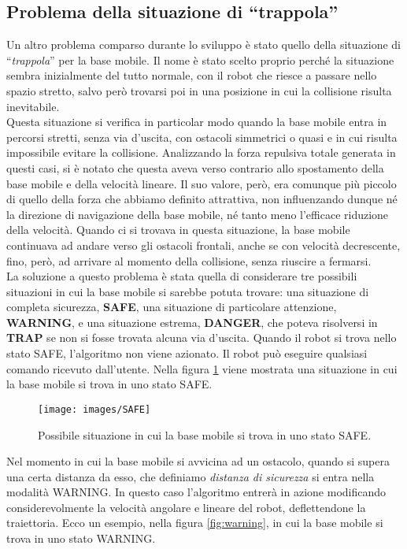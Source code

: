 \subsection{Problema della situazione di ``trappola''}
Un altro problema comparso durante lo sviluppo è stato quello della situazione di ``\textit{trappola}'' per la base mobile. Il nome è stato scelto proprio perché la situazione sembra inizialmente del tutto normale, con il robot che riesce a passare nello spazio stretto, salvo però trovarsi poi in una posizione in cui la collisione risulta inevitabile.\\
Questa situazione si verifica in particolar modo quando la base mobile entra in percorsi stretti, senza via d'uscita, con ostacoli simmetrici o quasi e in cui risulta impossibile evitare la collisione. Analizzando la forza repulsiva totale generata in questi casi, si è notato che questa aveva verso contrario allo spostamento della base mobile e della velocità lineare. Il suo valore, però, era comunque più piccolo di quello della forza che abbiamo definito attrattiva, non influenzando dunque né la direzione di navigazione della base mobile, né tanto meno l'efficace riduzione della velocità. Quando ci si trovava in questa situazione, la base mobile continuava ad andare verso gli ostacoli frontali, anche se con velocità decrescente, fino, però, ad arrivare al momento della collisione, senza riuscire a fermarsi.\\La soluzione a questo problema è stata quella di considerare tre possibili situazioni in cui la base mobile si sarebbe potuta trovare: una situazione di completa sicurezza, \textbf{SAFE}, una situazione di particolare attenzione, \textbf{WARNING}, e una situazione estrema, \textbf{DANGER}, che poteva risolversi in \textbf{TRAP} se non si fosse trovata alcuna via d'uscita. Quando il robot si trova nello stato SAFE, l’algoritmo non viene azionato. Il robot può eseguire qualsiasi comando ricevuto dall’utente. Nella figura \ref{fig:safe} viene mostrata una situazione in cui la base mobile si trova in uno stato SAFE.
\begin{figure}[H]
	\centering
	\texttt{[image: images/SAFE]}
	\caption{Possibile situazione in cui la base mobile si trova in uno stato SAFE.}
	\label{fig:safe}
\end{figure}
Nel momento in cui la base mobile si avvicina ad un ostacolo, quando si supera una certa distanza da esso, che definiamo \textit{distanza di sicurezza} si entra nella modalità WARNING. In questo caso l’algoritmo entrerà in azione modificando considerevolmente la velocità angolare e lineare del robot, deflettendone la traiettoria. Ecco un esempio, nella figura \ref{fig:warning}, in cui la base mobile si trova in uno stato WARNING.

